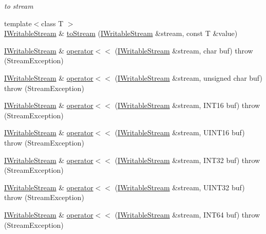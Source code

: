 \begin{DoxyCompactItemize}
\begin{DoxyCompactList}\small\item\em to stream \end{DoxyCompactList}\item 
{\footnotesize template$<$class T $>$ }\\\hyperlink{classsinsy_1_1IWritableStream}{\-I\-Writable\-Stream} \& \hyperlink{namespacesinsy_a9f5f033d66f944ca502a11285372c470}{to\-Stream} (\hyperlink{classsinsy_1_1IWritableStream}{\-I\-Writable\-Stream} \&stream, const \-T \&value)
\item 
\hyperlink{classsinsy_1_1IWritableStream}{\-I\-Writable\-Stream} \& \hyperlink{namespacesinsy_a35ddedb0cc97167dcea38a866a8dfa19}{operator$<$$<$} (\hyperlink{classsinsy_1_1IWritableStream}{\-I\-Writable\-Stream} \&stream, char buf)  throw (\-Stream\-Exception)
\item 
\hyperlink{classsinsy_1_1IWritableStream}{\-I\-Writable\-Stream} \& \hyperlink{namespacesinsy_a0576e41cfbe9bbc6ff08baf369b56777}{operator$<$$<$} (\hyperlink{classsinsy_1_1IWritableStream}{\-I\-Writable\-Stream} \&stream, unsigned char buf)  throw (\-Stream\-Exception)
\item 
\hyperlink{classsinsy_1_1IWritableStream}{\-I\-Writable\-Stream} \& \hyperlink{namespacesinsy_a037a2a75f4a8e34c22cdb7db830adb8e}{operator$<$$<$} (\hyperlink{classsinsy_1_1IWritableStream}{\-I\-Writable\-Stream} \&stream, \-I\-N\-T16 buf)  throw (\-Stream\-Exception)
\item 
\hyperlink{classsinsy_1_1IWritableStream}{\-I\-Writable\-Stream} \& \hyperlink{namespacesinsy_a79dacf2c59c6d78815069cc3ac301850}{operator$<$$<$} (\hyperlink{classsinsy_1_1IWritableStream}{\-I\-Writable\-Stream} \&stream, \-U\-I\-N\-T16 buf)  throw (\-Stream\-Exception)
\item 
\hyperlink{classsinsy_1_1IWritableStream}{\-I\-Writable\-Stream} \& \hyperlink{namespacesinsy_afae4322686988709520a5add528ecdc8}{operator$<$$<$} (\hyperlink{classsinsy_1_1IWritableStream}{\-I\-Writable\-Stream} \&stream, \-I\-N\-T32 buf)  throw (\-Stream\-Exception)
\item 
\hyperlink{classsinsy_1_1IWritableStream}{\-I\-Writable\-Stream} \& \hyperlink{namespacesinsy_afed623ea15dda362e9fec54609f6100a}{operator$<$$<$} (\hyperlink{classsinsy_1_1IWritableStream}{\-I\-Writable\-Stream} \&stream, \-U\-I\-N\-T32 buf)  throw (\-Stream\-Exception)
\item 
\hyperlink{classsinsy_1_1IWritableStream}{\-I\-Writable\-Stream} \& \hyperlink{namespacesinsy_a5e6d27d664f2e5eaefd538c036ec519b}{operator$<$$<$} (\hyperlink{classsinsy_1_1IWritableStream}{\-I\-Writable\-Stream} \&stream, \-I\-N\-T64 buf)  throw (\-Stream\-Exception)

\end{DoxyCompactItemize}
